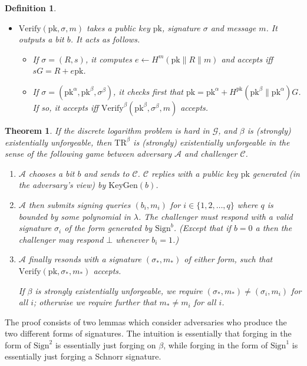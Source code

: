 \documentclass[letterpaper]{article}
\newtheorem{thrm}{Theorem}
\newtheorem{defn}{Definition}
\newcommand{\TR}[1]{\mathrm{TR}^{#1}}
\newcommand{\KeyGen}{\mathrm{KeyGen}}
\newcommand{\Sign}{\mathrm{Sign}}
\newcommand{\Verify}{\mathrm{Verify}}
\newcommand{\pk}{\mathrm{pk}}
\begin{document}
\begin{defn}
\begin{itemize}
\item $\Verify(\pk, \sigma, m)$ takes a public key $\pk$, signature $\sigma$ and
message $m$. It outputs a bit $b$. It acts as follows.

\begin{itemize}
\item If $\sigma = (R, s)$, it computes $e\gets H^m(\pk\|R\|m)$ and accepts
iff $sG = R + e\pk$.

\item If $\sigma = (\pk^\alpha, \pk^\beta, \sigma^\beta)$, it checks first that
$\pk = \pk^\alpha + H^\pk(\pk^\beta\|\pk^\alpha)G$. If so, it accepts iff
$\Verify^\beta(\pk^\beta, \sigma^\beta, m)$ accepts.
\end{itemize}

\end{itemize}

\end{defn}

\begin{thrm} If the discrete logarithm problem is hard in $\mathcal{G}$, and
$\beta$ is (strongly) existentially unforgeable, then $\TR\beta$ is (strongly)
existentially unforgeable in the sense of the following game between adversary
$\mathcal{A}$ and challenger $\mathcal{C}$.

\begin{enumerate}
\item $\mathcal{A}$ chooses a bit $b$ and sends to $\mathcal{C}$.
$\mathcal{C}$ replies with a public key $\pk$ generated (in the adversary's
view) by $\KeyGen(b)$.
\item $\mathcal{A}$ then submits signing queries $(b_i, m_i)$ for $i\in\{1,2,\ldots,q\}$
where $q$ is bounded by some polynomial in $\lambda$. The challenger must respond
with a valid signature $\sigma_i$ of the form generated by $\Sign^b$. (Except that
if $b=0$ a then the challenger may respond $\bot$ whenever $b_i=1$.)
\item $\mathcal{A}$ finally resonds with a signature $(\sigma_*, m_*)$ of either
form, such that $\Verify(\pk, \sigma_*, m_*)$ accepts.

If $\beta$ is strongly existentially unforgeable, we require $(\sigma_*, m_*)\neq
(\sigma_i, m_i)$ for all $i$; otherwise we require further that $m_*\neq m_i$ for
all $i$.
\end{enumerate}
\end{thrm}

The proof consists of two lemmas which consider adversaries who produce the
two different forms of signatures. The intuition is essentially that forging
in the form of $\Sign^2$ is essentially just forging on $\beta$, while
forging in the form of $\Sign^1$ is essentially just forging a Schnorr signature.
\end{document}
